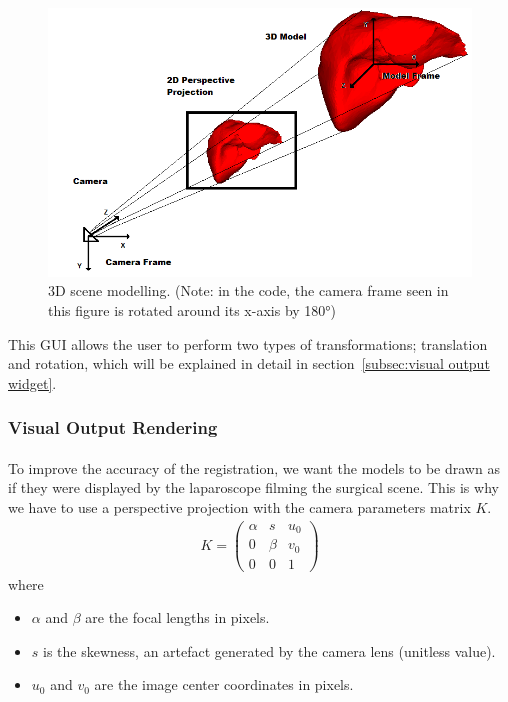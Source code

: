 \documentclass[12pt]{report}
\begin{document}
\begin{figure}[H]
\centerline{\includegraphics[scale = 0.8]{img/frame.png}}
\caption{3D scene modelling. (Note: in the code, the camera frame seen in this figure is rotated around its x-axis by 180°)}
\label{perspective projection}
\end{figure}

This GUI allows the user to perform two types of transformations; translation and rotation, which will be explained in detail in section~\ref{subsec:visual output widget}.




\subsubsection{Visual Output Rendering}
\paragraph{}
	To improve the accuracy of the registration, we want the models to be drawn as if they were displayed by the laparoscope filming the surgical scene. This is why we have to use a perspective projection with the camera parameters matrix $K$.
\begin{align}
K = \begin{pmatrix}
\alpha& s& u_0 \\
0& \beta& v_0 \\
0& 0& 1
\end{pmatrix}
\label{equ:camera parameters}
\end{align}
where
\begin{itemize}
\item $\alpha$ and $\beta$ are the focal lengths in pixels.
\item $s$ is the skewness, an artefact generated by the camera lens (unitless value).
\item $u_0$ and $v_0$ are the image center coordinates in pixels.
\end{itemize}
\end{document}
